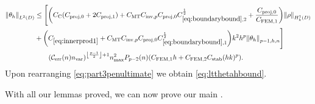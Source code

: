 \begin{align}
\NLtD{\thetah}&\leq \Bigg[\mleft(\Cc\mleft(\Cprojfn{0} + 2\Cprojfn{1}\mright) + \CMT \CinvVhp \Cprojfn{0} \Cboundaryt^{\half} + \frac{\Cprojfn{0}}{\CFEMo}  \mright)\NHokD{\rho}\nonumber \\
&+\mleft(  \Cfourteen  + \CMT \CinvVhp \Cprojfn{0}\Cboundaryo^{\half} \mright)k^2h^p\Nfn{p-1,h,n}{\thetah}\Bigg]\nonumber\\
&\quad\quad \mleft(\En \nvar\mright)^{\floor{\frac{p-1}2}+1}\nmax^2\Pfn{p-2}\mleft(n\mright)\mleft(\CFEMotilde h + \CFEMttilde \CAnk (hk)^p\mright)\label{eq:part3penultimate}.
\end{align}
Upon rearranging \cref{eq:part3penultimate} we obtain \cref{eq:ltthetahbound}.
\epf

With all our lemmas proved, we can now prove our main .

